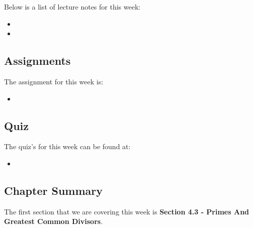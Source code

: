 \noindent Below is a list of lecture notes for this week:

\begin{itemize}
    \item {}
    \item {}
\end{itemize}

\subsection{Assignments}

The assignment for this week is:

\begin{itemize}
    \item {}
\end{itemize}

\subsection{Quiz}

The quiz's for this week can be found at:

\begin{itemize}
    \item {}
\end{itemize}

\subsection{Chapter Summary}

The first section that we are covering this week is \textbf{Section 4.3 - Primes And Greatest Common Divisors}.

